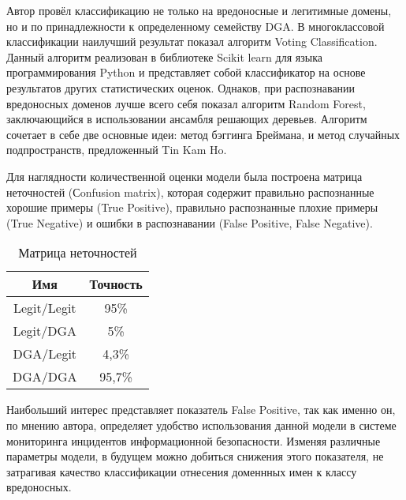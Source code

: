     Автор провёл классификацию не только на вредоносные и легитимные домены, но и по принадлежности к определенному семейству DGA. В многоклассовой классификации наилучший результат показал алгоритм Voting Classification. Данный алгоритм реализован в библиотеке Scikit learn для языка программирования Python и представляет собой классификатор на основе результатов других статистических оценок. Однаков, при распознавании вредоносных доменов лучше всего себя показал алгоритм Random Forest, заключающийся в использовании ансамбля решающих деревьев. Алгоритм сочетает в себе две основные идеи: метод бэггинга Бреймана, и метод случайных подпространств, предложенный Tin Kam Ho.

    Для наглядности количественной оценки модели была построена матрица неточностей (Сonfusion matrix), которая содержит правильно распознанные хорошие примеры (True Positive), правильно распознанные плохие примеры (True Negative) и ошибки в распознавании (False Positive, False Negative).
    \begin{table}[ht]
    \centering
    \caption{Матрица неточностей}\label{}
    \begin{tabular}{@{}cc@{}}
    \toprule
    Имя         & Точность \\ \midrule
    Legit/Legit & 95\%     \\
    Legit/DGA   & 5\%      \\
    DGA/Legit   & 4,3\%    \\
    DGA/DGA     & 95,7\%   \\ \bottomrule
    \end{tabular}
    \end{table}

    Наибольший интерес представляет показатель False Positive, так как именно он, по мнению автора, определяет удобство использования данной модели в системе мониторинга инцидентов информационной безопасности. Изменяя различные параметры модели, в будущем можно добиться снижения этого показателя, не затрагивая качество классификации отнесения доменнных имен к классу вредоносных.

